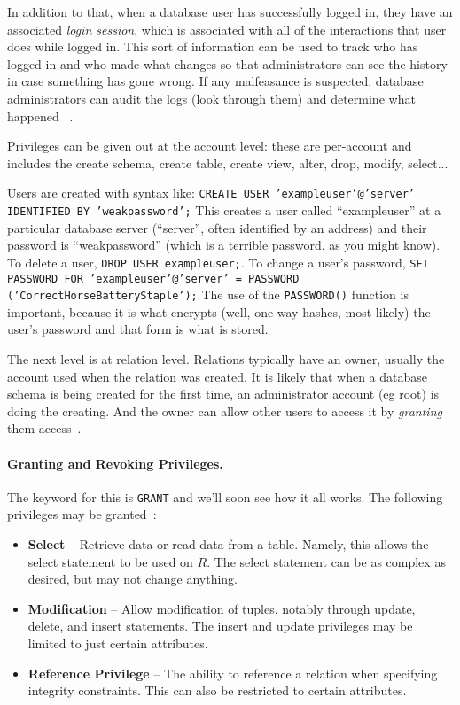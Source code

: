 \documentclass[a4paper]{report}
\begin{document}
In addition to that, when a database user has successfully logged in, they have an associated \textit{login session}, which is associated with all of the interactions that user does while logged in. This sort of information can be used to track who has logged in and who made what changes so that administrators can see the history in case something has gone wrong. If any malfeasance is suspected, database administrators can audit the logs (look through them) and determine what happened ~\cite{fds}.  

Privileges can be given out at the account level: these are per-account and includes the create schema, create table, create view, alter, drop, modify, select... 

Users are created with syntax like: \texttt{CREATE USER 'exampleuser'@'server' IDENTIFIED BY 'weakpassword';} This creates a user called ``exampleuser'' at a particular database server (``server'', often identified by an address) and their password is ``weakpassword'' (which is a terrible password, as you might know). To delete a user, \texttt{DROP USER exampleuser;}. To change a user's password, \texttt{SET PASSWORD FOR 'exampleuser'@'server' = PASSWORD ('CorrectHorseBatteryStaple');} The use of the \texttt{PASSWORD()} function is important, because it is what encrypts (well, one-way hashes, most likely) the user's password and that form is what is stored.

The next level is at relation level. Relations typically have an owner, usually the account used when the relation was created. It is likely that when a database schema is being created for the first time, an administrator account (eg root) is doing the creating. And the owner can allow other users to access it by \textit{granting} them access~\cite{fds}. 

\paragraph{Granting and Revoking Privileges.} The keyword for this is \texttt{GRANT} and we'll soon see how it all works. The following privileges may be granted~\cite{fds}:

\begin{itemize}
	\item \textbf{Select} -- Retrieve data or read data from a table. Namely, this allows the select statement to be used on $R$. The select statement can be as complex as desired, but may not change anything.
	\item \textbf{Modification}  -- Allow modification of tuples, notably through update, delete, and insert statements. The insert and update privileges may be limited to just certain attributes.
	\item \textbf{Reference Privilege} -- The ability to reference a relation when specifying integrity constraints. This can also be restricted to certain attributes.
\end{itemize}
\end{document}
